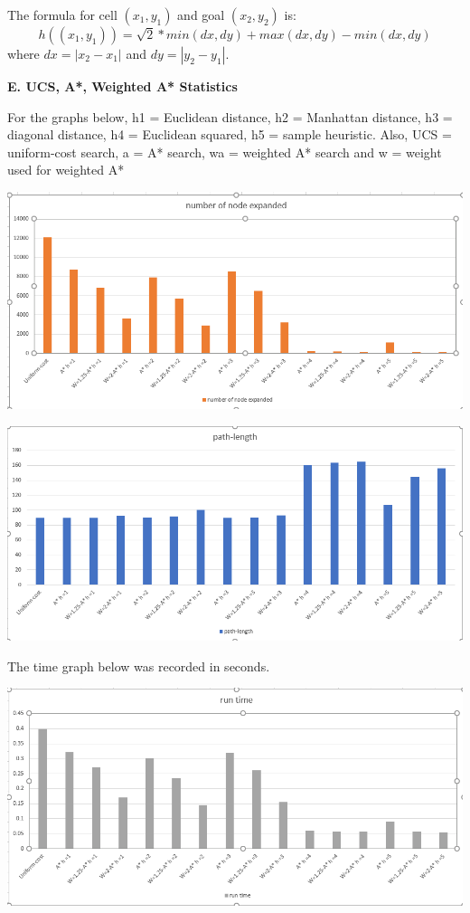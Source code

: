\documentclass[12pt, letterpaper]{article}
\begin{document}
The formula for cell $(x_1, y_1)$ and goal $(x_2, y_2)$ is:
$$h((x_1,y_1)) = \sqrt{2} * min(dx, dy) + max(dx, dy) - min(dx, dy)$$
where $dx = |x_2 - x_1|$ and $dy = |y_2 - y_1|$. 

\pagebreak %

\noindent \textbf{E. UCS, A*, Weighted A* Statistics}

For the graphs below, h1 = Euclidean distance, h2 = Manhattan distance, h3 = diagonal distance, h4 = Euclidean squared, h5 = sample heuristic. Also, UCS = uniform-cost search, a = A* search, wa = weighted A* search and w = weight used for weighted A*

\medskip

\noindent \includegraphics[scale=0.65]{"avg-nodeexpanded"}

\medskip

\noindent \includegraphics[scale=0.65]{"avg-pathlength"}

\medskip

The time graph below was recorded in seconds.

\medskip

\noindent \includegraphics[scale=0.65]{"avg-runtime"}
\end{document}
